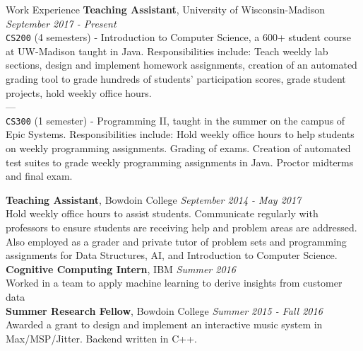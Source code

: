 \documentclass{resume} %
\begin{document}
\begin{rSection}{Work Experience}
{\bf Teaching Assistant}, University of Wisconsin-Madison \hfill {\em September 2017 - Present}
\\\texttt{CS200} (4 semesters) - Introduction to Computer Science, a 600+ student course at UW-Madison taught in Java. Responsibilities include: Teach weekly lab sections, design and implement homework assignments, creation of an automated grading tool to grade hundreds of students' participation scores, grade student projects, hold weekly office hours. \\
---\\
\texttt{CS300} (1 semester) - Programming II, taught in the summer on the campus of Epic Systems. Responsibilities include: Hold weekly office hours to help students on weekly programming assignments. Grading of exams. Creation of automated test suites to grade weekly programming assignments in Java. Proctor midterms and final exam.

{\bf Teaching Assistant}, Bowdoin College \hfill {\em September 2014 - May 2017}\\
Hold weekly office hours to assist students. Communicate regularly with professors to ensure students are receiving help and problem areas are addressed. Also employed as a grader and private tutor of problem sets and programming assignments for Data Structures, AI, and Introduction to Computer Science. \\

{\bf Cognitive Computing Intern}, IBM \hfill {\em Summer 2016} \\
Worked in a team to apply machine learning to derive insights from customer data\\

{\bf Summer Research Fellow}, Bowdoin College \hfill {\em Summer 2015 - Fall 2016}\\
Awarded a grant to design and implement an interactive music system in Max/MSP/Jitter. Backend written in C++.

\end{rSection}
\end{document}

